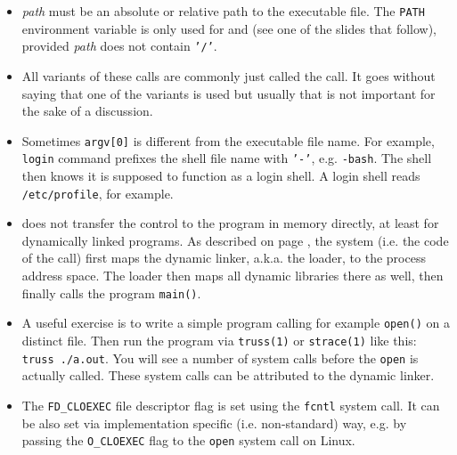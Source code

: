 \begin{itemize}
\item \emph{path} must be an absolute or relative path to the executable file.
The \texttt{PATH} environment variable is only used for  and
 (see one of the slides that follow),
provided \emph{path} does not contain \texttt{'/'}.
\item All variants of these calls are commonly just called the 
call.  It goes without saying that one of the variants is used but usually that
is not important for the sake of a discussion.
\item Sometimes \texttt{argv[0]} is different from the executable file name.
For example, \texttt{login} command prefixes the shell file name with
\texttt{'-'}, e.g. \texttt{-bash}.  The shell then knows it is supposed to
function as a login shell.  A login shell reads \texttt{/etc/profile}, for
example.
\item {} does not transfer the control to the program in memory
directly, at least for dynamically linked programs.
As described on page \pageref{RUNTIMELINKER}, the system (i.e. the
code of the  call) first maps the dynamic linker, a.k.a. the loader,
to the process address space.  The loader then maps all dynamic libraries there
as well, then finally calls the program \texttt{main()}.
\item A useful exercise is to write a simple program calling for example
\texttt{open()} on a distinct file.  Then run the program via \texttt{truss(1)}
or \texttt{strace(1)} like this: \texttt{truss ./a.out}. You will see a number
of system calls before the \texttt{open} is actually called. These system calls
can be attributed to the dynamic linker.
\item The \texttt{FD\_CLOEXEC} file descriptor flag is set using the
\texttt{fcntl} system call. It can be also set via implementation specific
(i.e. non-standard) way, e.g. by passing the \texttt{O\_CLOEXEC} flag to
the \texttt{open} system call on Linux.
\end{itemize}

